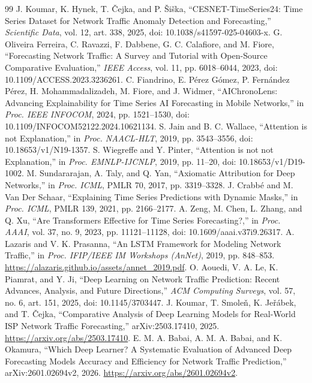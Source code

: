 \documentclass[conference]{IEEEtran}
\begin{document}
\begin{thebibliography}{99}
 J. Koumar, K. Hynek, T. \v{C}ejka, and P. \v{S}i\v{s}ka, ``CESNET-TimeSeries24: Time Series Dataset for Network Traffic Anomaly Detection and Forecasting,'' \emph{Scientific Data}, vol. 12, art. 338, 2025, doi: 10.1038/s41597-025-04603-x.
 G. Oliveira Ferreira, C. Ravazzi, F. Dabbene, G. C. Calafiore, and M. Fiore, ``Forecasting Network Traffic: A Survey and Tutorial with Open-Source Comparative Evaluation,'' \emph{IEEE Access}, vol. 11, pp. 6018--6044, 2023, doi: 10.1109/ACCESS.2023.3236261.
 C. Fiandrino, E. P\'erez G\'omez, P. Fern\'andez P\'erez, H. Mohammadalizadeh, M. Fiore, and J. Widmer, ``AIChronoLens: Advancing Explainability for Time Series AI Forecasting in Mobile Networks,'' in \emph{Proc. IEEE INFOCOM}, 2024, pp. 1521--1530, doi: 10.1109/INFOCOM52122.2024.10621134.
 S. Jain and B. C. Wallace, ``Attention is not Explanation,'' in \emph{Proc. NAACL-HLT}, 2019, pp. 3543--3556, doi: 10.18653/v1/N19-1357.
 S. Wiegreffe and Y. Pinter, ``Attention is not not Explanation,'' in \emph{Proc. EMNLP-IJCNLP}, 2019, pp. 11--20, doi: 10.18653/v1/D19-1002.
 M. Sundararajan, A. Taly, and Q. Yan, ``Axiomatic Attribution for Deep Networks,'' in \emph{Proc. ICML}, PMLR 70, 2017, pp. 3319--3328.
 J. Crabb\'e and M. Van Der Schaar, ``Explaining Time Series Predictions with Dynamic Masks,'' in \emph{Proc. ICML}, PMLR 139, 2021, pp. 2166--2177.
 A. Zeng, M. Chen, L. Zhang, and Q. Xu, ``Are Transformers Effective for Time Series Forecasting?,'' in \emph{Proc. AAAI}, vol. 37, no. 9, 2023, pp. 11121--11128, doi: 10.1609/aaai.v37i9.26317.
 A. Lazaris and V. K. Prasanna, ``An LSTM Framework for Modeling Network Traffic,'' in \emph{Proc. IFIP/IEEE IM Workshops (AnNet)}, 2019, pp. 848--853. \url{https://alazaris.github.io/assets/annet_2019.pdf}.
 O. Aouedi, V. A. Le, K. Piamrat, and Y. Ji, ``Deep Learning on Network Traffic Prediction: Recent Advances, Analysis, and Future Directions,'' \emph{ACM Computing Surveys}, vol. 57, no. 6, art. 151, 2025, doi: 10.1145/3703447.
 J. Koumar, T. Smole\v{n}, K. Je\v{r}\'abek, and T. \v{C}ejka, ``Comparative Analysis of Deep Learning Models for Real-World ISP Network Traffic Forecasting,'' arXiv:2503.17410, 2025. \url{https://arxiv.org/abs/2503.17410}.
 E. M. A. Babai, A. M. A. Babai, and K. Okamura, ``Which Deep Learner? A Systematic Evaluation of Advanced Deep Forecasting Models Accuracy and Efficiency for Network Traffic Prediction,'' arXiv:2601.02694v2, 2026. \url{https://arxiv.org/abs/2601.02694v2}.

\end{thebibliography}
\end{document}
